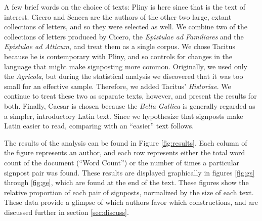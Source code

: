 A few brief words on the choice of texts: Pliny is here since that is the text of interest. Cicero and Seneca are the authors of the other two large, extant collections of letters, and so they were selected as well. We combine two of the collections of letters produced by Cicero, the \textit{Epistulae ad Familiares} and the \textit{Epistulae ad Atticum}, and treat them as a single corpus. We chose Tacitus because he is contemporary with Pliny, and so controls for changes in the language that might make signposting more common. Originally, we used only the \textit{Agricola}, but during the statistical analysis we discovered that it was too small for an effective sample. Therefore, we added Tacitus' \textit{Historiae}. We continue to treat these two as separate texts, however, and present the results for both. Finally, Caesar is chosen because the \textit{Bella Gallica} is generally regarded as a simpler, introductory Latin text. Since we hypothesize that signposts make Latin easier to read, comparing with an ``easier'' text follows.

The results of the analysis can be found in Figure \ref{fig:results}. Each column of the figure represents an author, and each row represents either the total word count of the document (``Word Count'') or the number of times a particular signpost pair was found. These results are displayed graphically in figures \ref{fig:gs} through \ref{fig:ge}, which are found at the end of the text. These figures show the relative proportion of each pair of signposts, normalized by the size of each text. These data provide a glimpse of which authors favor which constructions, and are discussed further in section \ref{sec:discuss}.

